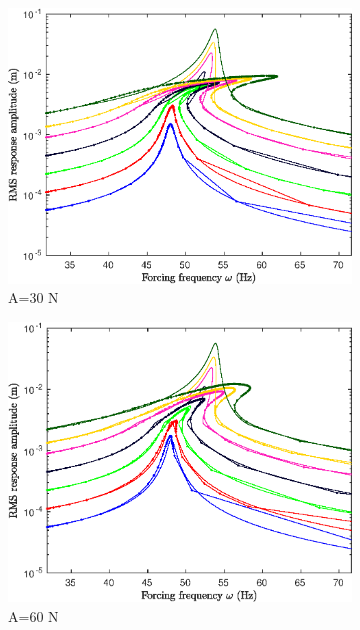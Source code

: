 \documentclass[aspectratio=169]{beamer}
\begin{document}
\begin{frame}
\begin{figure}
\begin{subfigure}{0.25\linewidth}
      \includegraphics[width=\linewidth]{../../benchmark5/FIGURES/pnlssfrf_Amp_b5_A30_up4_ms_full_na2_nx23}
      \caption{A=30 N}
    \end{subfigure}%
    \begin{subfigure}{0.25\linewidth}
      \includegraphics[width=\linewidth]{../../benchmark5/FIGURES/pnlssfrf_Amp_b5_A60_up4_ms_full_na2_nx23}
      \caption{A=60 N}
    \end{subfigure}%
    \begin{subfigure}{0.25\linewidth}

\end{subfigure}
\end{figure}
\end{frame}
\end{document}
